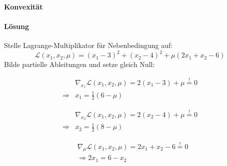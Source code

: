 \documentclass{article}
\begin{document}
\paragraph{Konvexität}
\paragraph{Lösung}
Stelle Lagrange-Multiplikator für Nebenbedingung auf:
\begin{equation*}
    \mathcal{L}(x_1,x_2,\mu) = (x_1 - 3)^2 + (x_2 -4)^2 + \mu(2x_1 + x_2 - 6 )
\end{equation*}
Bilde partielle Ableitungen und setze gleich Null:

\begin{equation}\label{dx1}
\begin{aligned}
            &\nabla_{x_1}\mathcal{L}(x_1,x_2,\mu) = 2(x_1-3)+\mu \overset{!}{=} 0 \\
        \Rightarrow& x_1 = \frac{1}{2}(6-\mu)
\end{aligned}
\end{equation}

\begin{equation}\label{dx2}
\begin{aligned}
    &\nabla_{x_2}\mathcal{L}(x_1,x_2,\mu) = 2(x_2-4)+\mu \overset{!}{=} 0 \\
    \Rightarrow& x_2 = \frac{1}{2}(8-\mu)
\end{aligned}
\end{equation}

\begin{equation}\label{dmu}
\begin{aligned}
    & \nabla_{\mu}\mathcal{L}(x_1,x_2,\mu) =2x_1+x_2-6 \overset{!}{=} 0 \\
& \Rightarrow 2x_1 = 6 - x_2
\end{aligned}
\end{equation}
\end{document}
